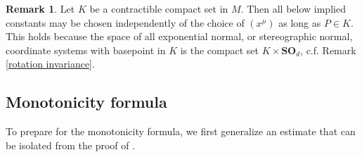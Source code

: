 \documentclass[reqno,10pt]{amsart}
\newcommand{\SpOrth}{\mathbf{SO}}
\theoremstyle{definition}
\newtheorem{remark}[theorem]{Remark}
\numberwithin{equation}{section}
\begin{document}
\begin{remark}\label{independence of constants}
Let $K$ be a contractible compact set in $M$.
Then all below implied constants may be chosen independently of the choice of $(x^\mu)$ as long as $P \in K$.
This holds because the space of all exponential normal, or stereographic normal, coordinate systems with basepoint in $K$ is the compact set $K \times \SpOrth_d$, c.f. Remark \ref{rotation invariance}.
\end{remark}

\subsection{Monotonicity formula}
To prepare for the monotonicity formula, we first generalize an estimate that can be isolated from the proof of \cite[Lemma 5.8]{Giusti77}.
\end{document}
